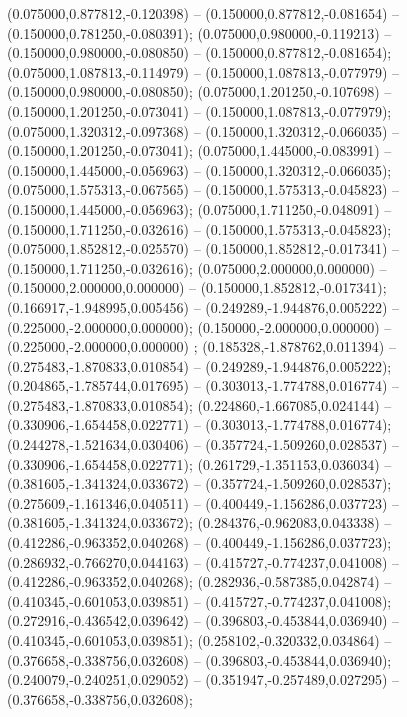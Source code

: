  (0.075000,0.877812,-0.120398) -- (0.150000,0.877812,-0.081654) -- (0.150000,0.781250,-0.080391);
 (0.075000,0.980000,-0.119213) -- (0.150000,0.980000,-0.080850) -- (0.150000,0.877812,-0.081654);
 (0.075000,1.087813,-0.114979) -- (0.150000,1.087813,-0.077979) -- (0.150000,0.980000,-0.080850);
 (0.075000,1.201250,-0.107698) -- (0.150000,1.201250,-0.073041) -- (0.150000,1.087813,-0.077979);
 (0.075000,1.320312,-0.097368) -- (0.150000,1.320312,-0.066035) -- (0.150000,1.201250,-0.073041);
 (0.075000,1.445000,-0.083991) -- (0.150000,1.445000,-0.056963) -- (0.150000,1.320312,-0.066035);
 (0.075000,1.575313,-0.067565) -- (0.150000,1.575313,-0.045823) -- (0.150000,1.445000,-0.056963);
 (0.075000,1.711250,-0.048091) -- (0.150000,1.711250,-0.032616) -- (0.150000,1.575313,-0.045823);
 (0.075000,1.852812,-0.025570) -- (0.150000,1.852812,-0.017341) -- (0.150000,1.711250,-0.032616);
 (0.075000,2.000000,0.000000) -- (0.150000,2.000000,0.000000) -- (0.150000,1.852812,-0.017341);
 (0.166917,-1.948995,0.005456) -- (0.249289,-1.944876,0.005222) -- (0.225000,-2.000000,0.000000);
 (0.150000,-2.000000,0.000000) -- (0.225000,-2.000000,0.000000) ;
 (0.185328,-1.878762,0.011394) -- (0.275483,-1.870833,0.010854) -- (0.249289,-1.944876,0.005222);
 (0.204865,-1.785744,0.017695) -- (0.303013,-1.774788,0.016774) -- (0.275483,-1.870833,0.010854);
 (0.224860,-1.667085,0.024144) -- (0.330906,-1.654458,0.022771) -- (0.303013,-1.774788,0.016774);
 (0.244278,-1.521634,0.030406) -- (0.357724,-1.509260,0.028537) -- (0.330906,-1.654458,0.022771);
 (0.261729,-1.351153,0.036034) -- (0.381605,-1.341324,0.033672) -- (0.357724,-1.509260,0.028537);
 (0.275609,-1.161346,0.040511) -- (0.400449,-1.156286,0.037723) -- (0.381605,-1.341324,0.033672);
 (0.284376,-0.962083,0.043338) -- (0.412286,-0.963352,0.040268) -- (0.400449,-1.156286,0.037723);
 (0.286932,-0.766270,0.044163) -- (0.415727,-0.774237,0.041008) -- (0.412286,-0.963352,0.040268);
 (0.282936,-0.587385,0.042874) -- (0.410345,-0.601053,0.039851) -- (0.415727,-0.774237,0.041008);
 (0.272916,-0.436542,0.039642) -- (0.396803,-0.453844,0.036940) -- (0.410345,-0.601053,0.039851);
 (0.258102,-0.320332,0.034864) -- (0.376658,-0.338756,0.032608) -- (0.396803,-0.453844,0.036940);
 (0.240079,-0.240251,0.029052) -- (0.351947,-0.257489,0.027295) -- (0.376658,-0.338756,0.032608);
